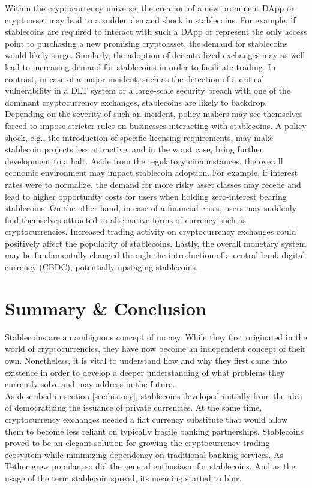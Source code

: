 \documentclass[conference]{IEEEtran}
\begin{document}
Within the cryptocurrency universe, the creation of a new prominent \ac{DApp} or cryptoasset may lead to a sudden demand shock in stablecoins. For example, if stablecoins are required to interact with such a DApp or represent the only access point to purchasing a new promising cryptoasset, the demand for stablecoins would likely surge. Similarly, the adoption of decentralized exchanges may as well lead to increasing demand for stablecoins in order to facilitate trading. In contrast, in case of a major incident, such as the detection of a critical vulnerability in a \ac{DLT} system or a large-scale security breach with one of the dominant cryptocurrency exchanges, stablecoins are likely to backdrop. Depending on the severity of such an incident, policy makers may see themselves forced to impose stricter rules on businesses interacting with stablecoins. A policy shock, e.g., the introduction of specific licensing requirements, may make stablecoin projects less attractive, and in the worst case, bring further development to a halt. Aside from the regulatory circumstances, the overall economic environment may impact stablecoin adoption. For example, if interest rates were to normalize, the demand for more risky asset classes may recede and lead to higher opportunity costs for users when holding zero-interest bearing stablecoins. On the other hand, in case of a financial crisis, users may suddenly find themselves attracted to alternative forms of currency such as cryptocurrencies. Increased trading activity on cryptocurrency exchanges could positively affect the popularity of stablecoins. Lastly, the overall monetary system may be fundamentally changed through the introduction of a central bank digital currency (CBDC), potentially upstaging stablecoins.

\section{Summary \& Conclusion}
Stablecoins are an ambiguous concept of money. While they first originated in the world of cryptocurrencies, they have now become an independent concept of their own. Nonetheless, it is vital to understand how and why they first came into existence in order to develop a deeper understanding of what problems they currently solve and may address in the future.\\

As described in section \ref{sec:history}, stablecoins developed initially from the idea of democratizing the issuance of private currencies. At the same time, cryptocurrency exchanges needed a fiat currency substitute that would allow them to become less reliant on typically fragile banking partnerships. Stablecoins proved to be an elegant solution for growing the cryptocurrency trading ecosystem while minimizing dependency on traditional banking services. As Tether grew popular, so did the general enthusiasm for stablecoins. And as the usage of the term stablecoin spread, its meaning started to blur.\\
\end{document}
